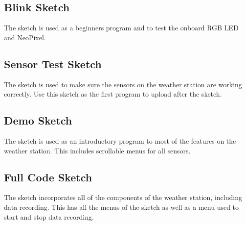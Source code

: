 \documentclass[letterpaper,10pt,english]{sphinxmanual}
\begin{document}
\sphinxstepscope


\subsection{Blink Sketch}
\label{\detokenize{software/blink:blink-sketch}}\label{\detokenize{software/blink:id1}}\label{\detokenize{software/blink::doc}}
\sphinxAtStartPar
The  sketch is used as a beginners program and to test the on\sphinxhyphen{}board RGB LED and NeoPixel.

\sphinxstepscope


\subsection{Sensor Test Sketch}
\label{\detokenize{software/sensor-test:sensor-test-sketch}}\label{\detokenize{software/sensor-test:sensor-test}}\label{\detokenize{software/sensor-test::doc}}
\sphinxAtStartPar
The  sketch is used to make sure the sensors on the weather station are working correctly. Use this sketch as the first program to upload after the  sketch.

\sphinxstepscope


\subsection{Demo Sketch}
\label{\detokenize{software/demo:demo-sketch}}\label{\detokenize{software/demo:id1}}\label{\detokenize{software/demo::doc}}
\sphinxAtStartPar
The  sketch is used as an introductory program to most of the features on the weather station. This includes scrollable menus for all sensors.

\sphinxstepscope


\subsection{Full Code Sketch}
\label{\detokenize{software/full-code:full-code-sketch}}\label{\detokenize{software/full-code:blink}}\label{\detokenize{software/full-code::doc}}
\sphinxAtStartPar
The  sketch incorporates all of the components of the weather station, including data recording. This has all the menus of the  sketch as well as a menu used to start and stop data recording.
\end{document}
